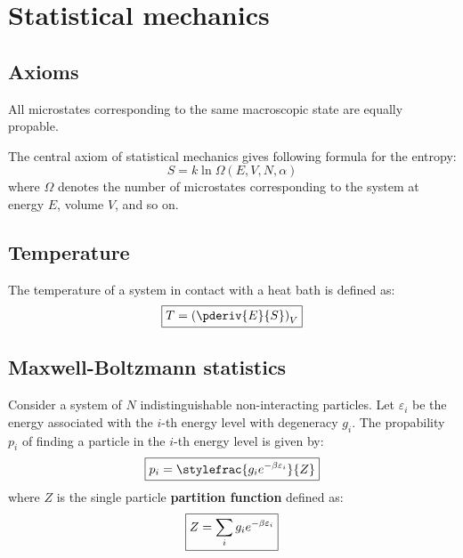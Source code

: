 \chapter{Statistical mechanics}

	\section{Axioms}
    
    \begin{theorem}
    	All microstates corresponding to the same macroscopic state are equally propable.
    \end{theorem}
	\begin{theorem}
    	The central axiom of statistical mechanics gives following formula for the entropy:
		\begin{equation}
			\label{statmech:boltzmann_formula}
            \boxed{S = k\ln\Omega(E, V, N, \alpha)}
		\end{equation}
        where $\Omega$ denotes the number of microstates corresponding to the system at energy $E$, volume $V$, and so on.
	\end{theorem}
    
	\section{Temperature}
    	The temperature of a system in contact with a heat bath is defined as:
    	\begin{equation}
        	\label{statmech:temperature}
			\boxed{T = \left(\pderiv{E}{S}\right)_V}
		\end{equation}
    
\section{Maxwell-Boltzmann statistics}
    	Consider a system of $N$ indistinguishable non-interacting particles. Let $\varepsilon_i$ be the energy associated with the $i$-th energy level with degeneracy $g_i$. The propability $p_i$ of finding a particle in the $i$-th energy level is given by:
    	\begin{equation}
			\boxed{p_i = \stylefrac{g_i e^{-\beta\varepsilon_i}}{Z}}
		\end{equation}
        where $Z$ is the single particle \textbf{partition function} defined as:
        \begin{equation}\index{partition function}
			\label{statmech:partition_function}
            \boxed{Z = \sum_i{g_ie^{-\beta\varepsilon_i}}}
		\end{equation}
        
